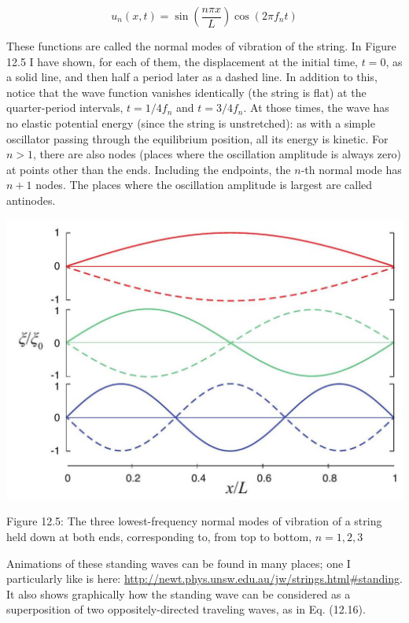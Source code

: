 \documentclass[10pt]{article}
\begin{document}
\begin{equation*}
u_{n}(x, t)=\sin \left(\frac{n \pi x}{L}\right) \cos \left(2 \pi f_{n} t\right) \tag{12.19}
\end{equation*}


These functions are called the normal modes of vibration of the string. In Figure 12.5 I have shown, for each of them, the displacement at the initial time, $t=0$, as a solid line, and then half a period later as a dashed line. In addition to this, notice that the wave function vanishes identically (the string is flat) at the quarter-period intervals, $t=1 / 4 f_{n}$ and $t=3 / 4 f_{n}$. At those times, the wave has no elastic potential energy (since the string is unstretched): as with a simple oscillator passing through the equilibrium position, all its energy is kinetic. For $n>1$, there are also nodes (places where the oscillation amplitude is always zero) at points other than the ends. Including the endpoints, the $n$-th normal mode has $n+1$ nodes. The places where the oscillation amplitude is largest are called antinodes.

\begin{center}
\includegraphics[max width=\textwidth]{2024_09_14_9969b06773f10b6936e8g-309}
\end{center}

Figure 12.5: The three lowest-frequency normal modes of vibration of a string held down at both ends, corresponding to, from top to bottom, $n=1,2,3$

Animations of these standing waves can be found in many places; one I particularly like is here: \href{http://newt.phys.unsw.edu.au/jw/strings.html#standing}{http://newt.phys.unsw.edu.au/jw/strings.html\#standing}. It also shows graphically how the standing wave can be considered as a superposition of two oppositely-directed traveling waves, as in Eq. (12.16).
\end{document}
